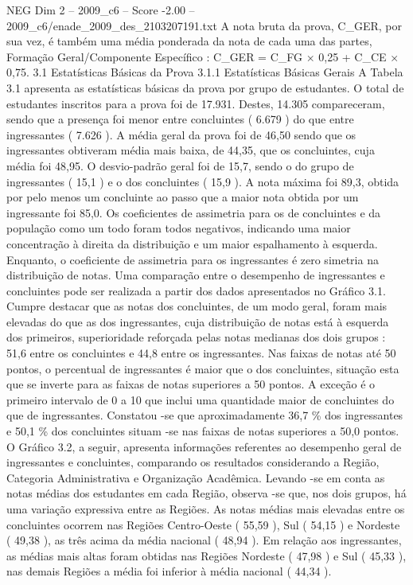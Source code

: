 \begin{textsample}{NEG Dim 2 – 2009\_c6 – Score -2.00 – 2009\_c6/enade\_2009\_des\_2103207191.txt}
A nota bruta da prova, C\_GER, por sua vez, é também uma média ponderada da nota de cada uma das partes, Formação Geral/Componente Específico : C\_GER = C\_FG × 0,25 + C\_CE × 0,75. 3.1 Estatísticas Básicas da Prova 3.1.1 Estatísticas Básicas Gerais A Tabela 3.1 apresenta as estatísticas básicas da prova por grupo de estudantes.
O total de estudantes inscritos para a prova foi de 17.931.
Destes, 14.305 compareceram, sendo que a presença foi menor entre concluintes ( 6.679 ) do que entre ingressantes ( 7.626 ).
A média geral da prova foi de 46,50 sendo que os ingressantes obtiveram média mais baixa, de 44,35, que os concluintes, cuja média foi 48,95.
O desvio-padrão geral foi de 15,7, sendo o do grupo de ingressantes ( 15,1 ) e o dos concluintes ( 15,9 ).
A nota máxima foi 89,3, obtida por pelo menos um concluinte ao passo que a maior nota obtida por um ingressante foi 85,0.
Os coeficientes de assimetria para os de concluintes e da população como um todo foram todos negativos, indicando uma maior concentração à direita da distribuição e um maior espalhamento à esquerda.
Enquanto, o coeficiente de assimetria para os ingressantes é zero simetria na distribuição de notas.
Uma comparação entre o desempenho de ingressantes e concluintes pode ser realizada a partir dos dados apresentados no Gráfico 3.1.
Cumpre destacar que as notas dos concluintes, de um modo geral, foram mais elevadas do que as dos ingressantes, cuja distribuição de notas está à esquerda dos primeiros, superioridade reforçada pelas notas medianas dos dois grupos : 51,6 entre os concluintes e 44,8 entre os ingressantes.
Nas faixas de notas até 50 pontos, o percentual de ingressantes é maior que o dos concluintes, situação esta que se inverte para as faixas de notas superiores a 50 pontos.
A exceção é o primeiro intervalo de 0 a 10 que inclui uma quantidade maior de concluintes do que de ingressantes.
Constatou -se que aproximadamente 36,7 \% dos ingressantes e 50,1 \% dos concluintes situam -se nas faixas de notas superiores a 50,0 pontos.
O Gráfico 3.2, a seguir, apresenta informações referentes ao desempenho geral de ingressantes e concluintes, comparando os resultados considerando a Região, Categoria Administrativa e Organização Acadêmica.
Levando -se em conta as notas médias dos estudantes em cada Região, observa -se que, nos dois grupos, há uma variação expressiva entre as Regiões.
As notas médias mais elevadas entre os concluintes ocorrem nas Regiões Centro-Oeste ( 55,59 ), Sul ( 54,15 ) e Nordeste ( 49,38 ), as três acima da média nacional ( 48,94 ).
Em relação aos ingressantes, as médias mais altas foram obtidas nas Regiões Nordeste ( 47,98 ) e Sul ( 45,33 ), nas demais Regiões a média foi inferior à média nacional ( 44,34 ).

\end{textsample}
